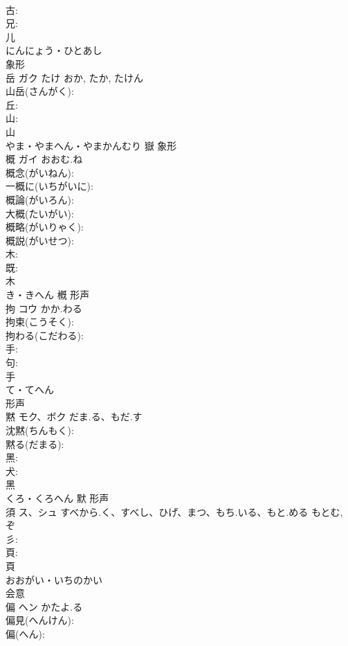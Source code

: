 \documentclass[8pt]{extreport}
\begin{document}
\begin{CJK}{UTF8}{min}
\\	古: 
\\	兄: 
\\	儿	
\\	にんにょう・ひとあし	
\\	象形 
\\	岳	ガク	たけ	おか, たか, たけん	
\\	山岳(さんがく): 
\\	丘: 
\\	山: 
\\	山	
\\	やま・やまへん・やまかんむり	嶽	象形 
\\	概	ガイ	おおむ.ね		
\\	概念(がいねん): 
\\	一概に(いちがいに): 
\\	概論(がいろん): 
\\	大概(たいがい): 
\\	概略(がいりゃく): 
\\	概説(がいせつ): 
\\	木: 
\\	既: 
\\	木	
\\	き・きへん	槪	形声 
\\	拘	コウ	かか.わる		
\\	拘束(こうそく): 
\\	拘わる(こだわる): 
\\	手: 
\\	句: 
\\	手	
\\	て・てへん	
\\	形声 
\\	黙	モク、ボク	だま.る、もだ.す		
\\	沈黙(ちんもく): 
\\	黙る(だまる): 
\\	黑: 
\\	犬: 
\\	黑	
\\	くろ・くろへん	默	形声 
\\	須	ス、シュ	すべから.く、すべし、ひげ、まつ、もち.いる、もと.める	もとむ, ぞ	
\\	彡: 
\\	頁: 
\\	頁	
\\	おおがい・いちのかい	
\\	会意 
\\	偏	ヘン	かたよ.る		
\\	偏見(へんけん): 
\\	偏(へん): 

\end{CJK}
\end{document}
